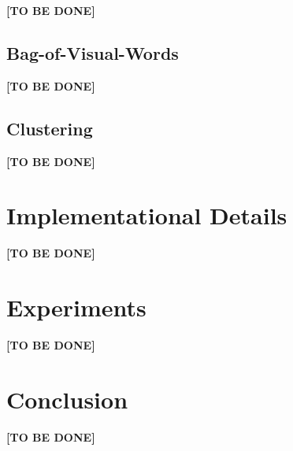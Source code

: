 \documentclass{vldb}
\newcommand{\tbd}{\textbf{[TO BE DONE]}}
\begin{document}
\tbd

\subsection{Bag-of-Visual-Words}
\label{subsec:bovw}

\tbd

\subsection{Clustering}
\label{subsec:clustering}

\tbd

\section{Implementational Details}
\label{sec:implementational-details}

\tbd

\section{Experiments}
\label{sec:experiments}

\tbd

\section{Conclusion}
\label{sec:conclusion}

\tbd

\balance




\end{document}
